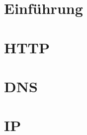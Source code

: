 \usepackage[utf8]{inputenc}
\usepackage[T1]{fontenc}
\usepackage{graphicx,amssymb,amsmath,multirow,tabularx,pgf,pgfpages}
\usepackage{libertine}
\usepackage{tikz}
\usepackage{standalone}
\usepackage[ngerman]{babel}

\usepackage{listings}
\usepackage{booktabs}
\usetikzlibrary{datavisualization}

\newcommand{\theauthor}{Prof.~Dr.~A. Fischer}
\newcommand{\thedate}{04.02.2021}
\newcommand{\thetime}{08:30}
\newcommand{\semester}{WS 2020/21}
\newcommand{\course}{Computernetze}
\newcommand{\programme}{BA Medientechnik \quad Medieninformatik}
\newcommand{\examtype}{Take-Home Exam}
\newcommand{\duration}{90 Minuten}
\newcommand{\supplies}{Keine Beschränkung}
\newcommand{\faculty}{Angewandte Informatik}








\begin{questions}

	\section{Einführung}
	
	\clearpage

	\section{HTTP}
	
	\clearpage

	\section{DNS}
	
	\clearpage

	\section{IP}
	

\end{questions}

